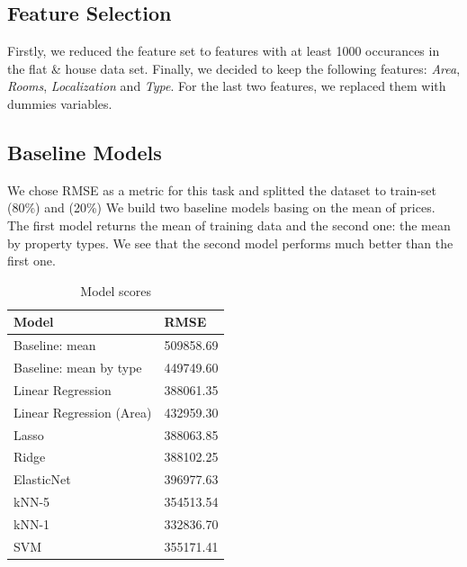 \documentclass[11pt,a4paper]{article}
\begin{document}
\subsection{Feature Selection}%
\label{sub:feature_selection}
Firstly, we reduced the feature set to features with at least 1000 occurances in the flat \& house data set. Finally, we decided to keep the following features: \emph{Area}, \emph{Rooms}, \emph{Localization} and \emph{Type}. For the last two features, we replaced them with dummies variables.

\subsection{Baseline Models}%
\label{sub:baseline_models}
We chose RMSE as a metric for this task and splitted the dataset to train-set (80\%) and (20\%) We build two baseline models basing on the mean of prices. The first model returns the mean of training data and the second one: the mean by property types. We see that the second model performs much better than the first one.
\begin{table}[]
  \centering
  \caption{Model scores}
  \label{my-label}
  \begin{tabular}{|l|l|}
    \hline
    Model                        & RMSE                           \\ \hline
    Baseline: mean               & \multicolumn{1}{r|}{509858.69} \\ \hline
    Baseline: mean by type       & 449749.60                      \\ \hline
    Linear Regression            & 388061.35                      \\ \hline
    Linear Regression (Area)     & 432959.30                      \\ \hline
    Lasso                        & 388063.85                      \\ \hline
    Ridge                        & 388102.25                      \\ \hline
    ElasticNet                   & 396977.63                      \\ \hline
    kNN-5                        & 354513.54                      \\ \hline
    kNN-1                        & 332836.70                      \\ \hline
    SVM                          & 355171.41                      \\ \hline
  \end{tabular}
\end{table}
\end{document}

